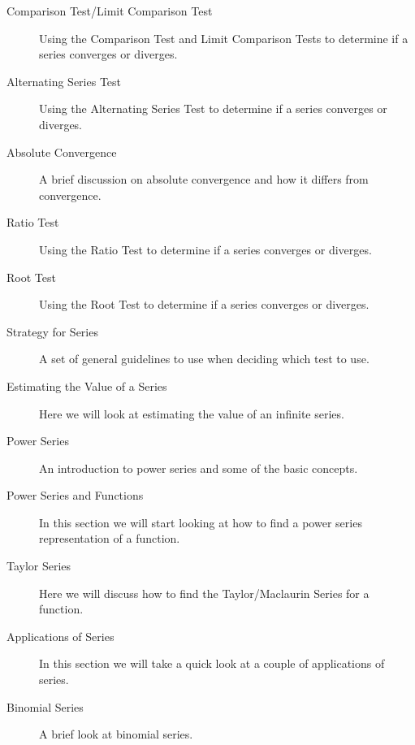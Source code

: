 \documentclass{article}
\begin{document}
	
	\begin{description}
\item[Comparison Test/Limit Comparison Test]  Using the Comparison Test and Limit Comparison Tests to determine if a series converges or diverges.
 
\item[Alternating Series Test]  Using the Alternating Series Test to determine if a series converges or diverges.
 
\item[Absolute Convergence]  A brief discussion on absolute convergence and how it differs from convergence.
 
\item[Ratio Test]  Using the Ratio Test to determine if a series converges or diverges.
\end{description}


	
\begin{description}
\item[Root Test]  Using the Root Test to determine if a series converges or diverges.
 
\item[Strategy for Series]  A set of general guidelines to use when deciding which test to use.
 
\item[Estimating the Value of a Series]  Here we will look at estimating the value of an infinite series.
 
\item[Power Series]  An introduction to power series and some of the basic concepts.

\end{description}


	
\begin{description}	
\item[Power Series and Functions]  In this section we will start looking at how to find a power series representation of a function.
 
\item[Taylor Series]  Here we will discuss how to find the Taylor/Maclaurin Series for a function.
 
\item[Applications of Series]  In this section we will take a quick look at a couple of applications of series.
 
\item[Binomial Series]  A brief look at binomial series.
\end{description}

\end{document}
